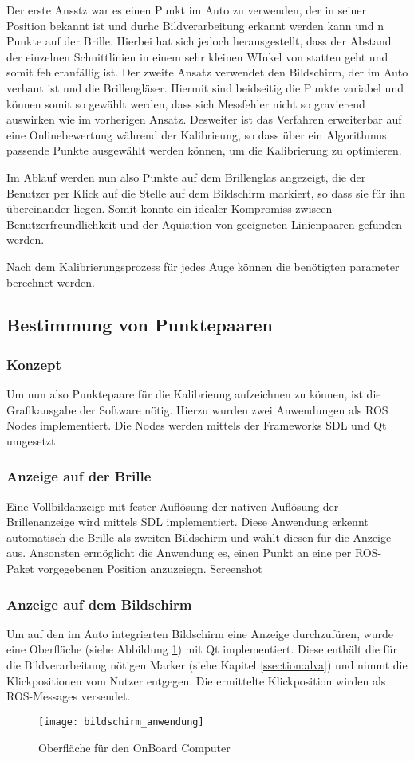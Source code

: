 Der erste Ansstz war es einen Punkt im Auto zu verwenden, der in seiner Position bekannt ist und durhc Bildverarbeitung erkannt werden kann und n Punkte auf der Brille. Hierbei hat sich jedoch herausgestellt, dass der Abstand der einzelnen Schnittlinien in einem sehr kleinen WInkel von statten geht und somit fehleranfällig ist. Der zweite Ansatz verwendet den Bildschirm, der im Auto verbaut ist und die Brillengläser. Hiermit sind beidseitig die Punkte variabel und können somit so gewählt werden, dass sich Messfehler nicht so gravierend auswirken wie im vorherigen Ansatz. Desweiter ist das Verfahren erweiterbar auf eine Onlinebewertung während der Kalibrieung, so dass über ein Algorithmus passende Punkte ausgewählt werden können, um die Kalibrierung zu optimieren.

Im Ablauf werden nun also Punkte auf dem Brillenglas angezeigt, die der Benutzer per Klick auf die Stelle auf dem Bildschirm markiert, so dass sie für ihn übereinander liegen. Somit konnte ein idealer Kompromiss zwiscen Benutzerfreundlichkeit und der Aquisition von geeigneten Linienpaaren gefunden werden.

Nach dem Kalibrierungsprozess für jedes Auge können die benötigten parameter berechnet werden.


\subsection{Bestimmung von Punktepaaren}
\label{chap:punktepaare}
\subsubsection{Konzept}
Um nun also Punktepaare für die Kalibrieung aufzeichnen zu können, ist die Grafikausgabe der Software nötig. Hierzu wurden zwei Anwendungen als ROS Nodes implementiert. Die Nodes werden mittels der Frameworks SDL und Qt umgesetzt.
\subsubsection{Anzeige auf der Brille}
Eine Vollbildanzeige mit fester Auflösung der nativen Auflösung der Brillenanzeige wird mittels SDL implementiert. Diese Anwendung erkennt automatisch die Brille als zweiten Bildschirm und wählt diesen für die Anzeige aus. Ansonsten ermöglicht die Anwendung es, einen Punkt an eine per ROS-Paket vorgegebenen Position anzuzeiegn.
Screenshot
\subsubsection{Anzeige auf dem Bildschirm}
Um auf den im Auto integrierten Bildschirm eine Anzeige durchzufüren, wurde eine Oberfläche (siehe Abbildung \ref{fig:fensteranwendung}) mit Qt implementiert. Diese enthält die für die Bildverarbeitung nötigen Marker (siehe Kapitel \ref{ssection:alva}) und nimmt die Klickpositionen vom Nutzer entgegen. Die ermittelte Klickposition wirden als ROS-Messages versendet.
\begin{figure}[h]
   \centering
   \texttt{[image: bildschirm\_anwendung]}
   \caption{Oberfläche für den OnBoard Computer}
   \label{fig:fensteranwendung}
\end{figure}


